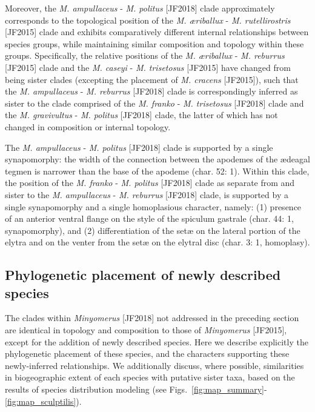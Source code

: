 \documentclass[fleqn,10pt,lineno]{wlpeerj} %
\begin{document}
		Moreover, the \textit{M. ampullaceus} - \textit{M. politus} [JF2018] clade approximately corresponds to the topological position of the \textit{M. {\ae}riballux} - \textit{M. rutellirostris} [JF2015] clade and exhibits comparatively different internal relationships between species groups, while maintaining similar composition and topology within these groups.
		Specifically, the relative positions of the \textit{M. {\ae}riballux} - \textit{M. reburrus} [JF2015] clade and the \textit{M. caseyi} - \textit{M. trisetosus} [JF2015] have changed from being sister clades (excepting the placement of \textit{M. cracens} [JF2015]), such that the \textit{M. ampullaceus} - \textit{M. reburrus} [JF2018] clade is correspondingly inferred as sister to the clade comprised of the \textit{M. franko} - \textit{M. trisetosus} [JF2018] clade and the \textit{M. gravivultus} - \textit{M. politus} [JF2018] clade, the latter of which has not changed in composition or internal topology.
		
		The \textit{M. ampullaceus} - \textit{M. politus} [JF2018] clade is supported by a single synapomorphy: the width of the connection between the apodemes of the {\ae}deagal tegmen is narrower than the base of the apodeme (char. 52: 1).
		Within this clade, the position of the \textit{M. franko} - \textit{M. politus} [JF2018] clade as separate from and sister to the \textit{M. ampullaceus} - \textit{M. reburrus} [JF2018] clade, is supported by a single synapomorphy and a single homoplasious character, namely: (1) presence of an anterior ventral flange on the style of the spiculum gastrale (char. 44: 1, synapomorphy), and (2) differentiation of the set{\ae} on the lateral portion of the elytra and on the venter from the set{\ae} on the elytral disc (char. 3: 1, homoplasy).		
		
	\subsection*{Phylogenetic placement of newly described species}\label{ssec:place}
		The clades within \textit{Minyomerus} [JF2018] not addressed in the preceding section are identical in topology and composition to those of \textit{Minyomerus} [JF2015], except for the addition of newly described species.
		Here we describe explicitly the phylogenetic placement of these species, and the characters supporting these newly-inferred relationships.
		We additionally discuss, where possible, similarities in biogeographic extent of each species with putative sister taxa, based on the results of species distribution modeling (see Figs.~\ref{fig:map_summary}-\ref{fig:map_sculptilis}).
		
\end{document}
